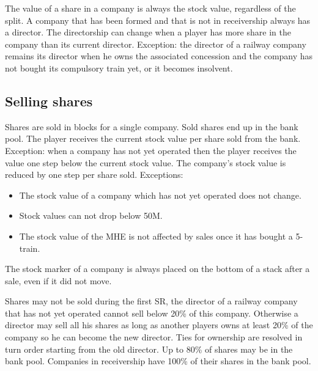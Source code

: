 \documentclass[a4paper,twocolumn]{article}
\begin{document}
The value of a share in a company is always the stock value, regardless of the
split. A company that has been formed and that is not in receivership always has
a director. The directorship can change when a player has more share in the
company than its current director. Exception: the director of a railway company
remains its director when he owns the associated concession and the company has
not bought its compulsory train yet, or it becomes insolvent.

\subsection{Selling shares}
Shares are sold in blocks for a single company. Sold shares end up in the bank
pool. The player receives the current stock value per share sold from the bank.
Exception: when a company has not yet operated then the player receives the
value one step below the current stock value. The company's stock value is
reduced by one step per share sold. Exceptions:
\begin{itemize}
	\item The stock value of a company which has not yet operated does not
	change.
	\item Stock values can not drop below 50M.
	\item The stock value of the MHE is not affected by sales once it has
	bought a 5-train.
\end{itemize}

The stock marker of a company is always placed on the bottom of a stack after a
sale, even if it did not move.

Shares may not be sold during the first SR, the director of a railway company
that has not yet operated cannot sell below 20\% of this company. Otherwise a
director may sell all his shares as long as another players owns at least 20\%
of the company so he can become the new director. Ties for ownership are
resolved in turn order starting from the old director. Up to 80\% of shares may
be in the bank pool. Companies in receivership have 100\% of their shares in the
bank pool.
\end{document}
